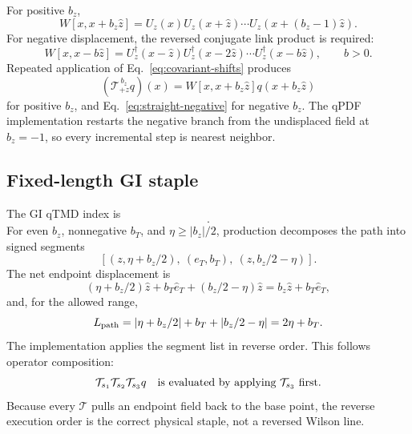 \documentclass[11pt,a4paper]{article}
\numberwithin{equation}{section}
\newcommand{\abs}[1]{\left|#1\right|}
\begin{document}
For positive \(b_z\),
\begin{equation}
 W[x,x+b_z\hat z]
 =U_z(x)U_z(x+\hat z)\cdots
 U_z(x+(b_z-1)\hat z).
 \label{eq:straight-positive}
\end{equation}
For negative displacement, the reversed conjugate link product is required:
\begin{equation}
 W[x,x-b\hat z]
 =U_z^\dagger(x-\hat z)
 U_z^\dagger(x-2\hat z)\cdots
 U_z^\dagger(x-b\hat z),\qquad b>0.
 \label{eq:straight-negative}
\end{equation}
Repeated application of Eq.~\eqref{eq:covariant-shifts} produces
\begin{equation}
 (\mathcal T_{+z}^{\,b_z}q)(x)
 =W[x,x+b_z\hat z]q(x+b_z\hat z)
\end{equation}
for positive \(b_z\), and Eq.~\eqref{eq:straight-negative} for negative
\(b_z\).  The qPDF implementation restarts the negative branch from the
undisplaced field at \(b_z=-1\), so every incremental step is nearest
neighbor.

\subsection{Fixed-length GI staple}

The GI qTMD index is
\begin{equation}
 [b_T,b_z,\eta,\mathrm{dir}_T].
\end{equation}
For even \(b_z\), nonnegative \(b_T\), and
\(\eta\geq\abs{b_z}/2\), production decomposes the path into signed segments
\begin{equation}
 \left[
 (z,\eta+b_z/2),\
 (e_T,b_T),\
 (z,b_z/2-\eta)
 \right].
 \label{eq:staple-segments}
\end{equation}
The net endpoint displacement is
\begin{equation}
 (\eta+b_z/2)\hat z+b_T\hat e_T
 +(b_z/2-\eta)\hat z
 =b_z\hat z+b_T\hat e_T,
\end{equation}
and, for the allowed range,
\begin{equation}
 L_{\rm path}
 =\abs{\eta+b_z/2}+b_T+\abs{b_z/2-\eta}
 =2\eta+b_T.
\end{equation}
The implementation applies the segment list in reverse order.  This follows
operator composition:
\begin{equation}
 \mathcal T_{s_1}\mathcal T_{s_2}\mathcal T_{s_3}q
 \quad\hbox{is evaluated by applying }\mathcal T_{s_3}
 \hbox{ first}.
\end{equation}
Because every \(\mathcal T\) pulls an endpoint field back to the base point,
the reverse execution order is the correct physical staple, not a reversed
Wilson line.
\end{document}
